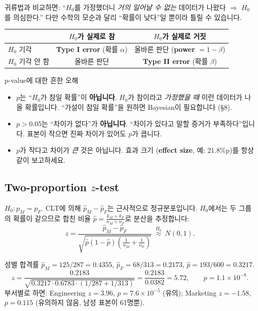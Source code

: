 \documentclass[11pt,a4paper]{article}
\newcommand{\term}[1]{\textbf{#1}}
\begin{document}
귀류법과 비교하면: ``$H_0$를 가정했더니 \emph{거의 일어날 수 없는} 데이터가 나왔다 $\Rightarrow$ $H_0$를 의심한다.'' 다만 수학의 모순과 달리 ``확률이 낮다''일 뿐이라 틀릴 수 있습니다.

\begin{center}
\begin{tabular}{@{}l c c@{}}
\toprule
 & $H_0$가 실제로 참 & $H_0$가 실제로 거짓 \\
\midrule
$H_0$ 기각 & \term{Type I error} (확률 $\alpha$) & 올바른 판단 (\term{power} $=1-\beta$) \\
$H_0$ 기각 안 함 & 올바른 판단 & \term{Type II error} (확률 $\beta$) \\
\bottomrule
\end{tabular}
\end{center}

\begin{whybox}{p-value에 대한 흔한 오해}
\begin{itemize}
\item $p$는 ``$H_0$가 참일 확률''이 \textbf{아닙니다}. $H_0$가 참이라고 \emph{가정했을 때} 이런 데이터가 나올 확률입니다. ``가설이 참일 확률''을 원하면 Bayesian이 필요합니다 (\S8).
\item $p>0.05$는 ``차이가 없다''가 \textbf{아닙니다}. ``차이가 있다고 말할 증거가 부족하다''입니다. 표본이 작으면 진짜 차이가 있어도 $p$가 큽니다.
\item $p$가 작다고 차이가 \emph{큰} 것은 아닙니다. 효과 크기 (\term{effect size}, 예: 21.8\%p)를 항상 같이 보고하세요.
\end{itemize}
\end{whybox}

\subsection{Two-proportion $z$-test}
$H_0: p_M=p_F$. CLT에 의해 $\hat p_M-\hat p_F$는 근사적으로 정규분포입니다. $H_0$에서는 두 그룹의 확률이 같으므로 합친 비율 $\hat p=\frac{k_M+k_F}{n_M+n_F}$로 분산을 추정합니다:
\[
z=\frac{\hat p_M-\hat p_F}{\sqrt{\hat p(1-\hat p)\left(\frac1{n_M}+\frac1{n_F}\right)}}\ \overset{H_0}{\approx}\ N(0,1).
\]

\begin{databox}{성별 합격률}
$\hat p_M=125/287=0.4355$, $\hat p_F=68/313=0.2173$, $\hat p=193/600=0.3217$.
\[
z=\frac{0.2183}{\sqrt{0.3217\cdot0.6783\cdot(1/287+1/313)}}=\frac{0.2183}{0.0382}=5.72,\qquad p=1.1\times10^{-8}.
\]
부서별로 하면: Engineering $z=3.96$, $p=7.6\times10^{-5}$ (유의); Marketing $z=-1.58$, $p=0.115$ (유의하지 않음, 남성 표본이 61명뿐).
\end{databox}
\end{document}
